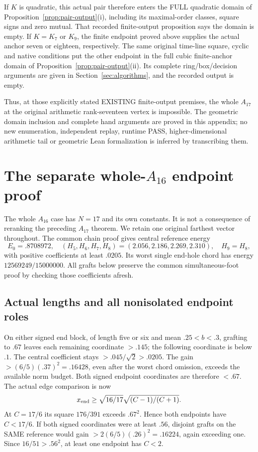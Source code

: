 If \(K\) is quadratic, this actual pair therefore enters the FULL
quadratic domain of Proposition~\ref{prop:pair-output}(i),
including its maximal-order classes, square signs and zero mutual.
That recorded finite-output proposition says the domain is empty.
If \(K=K_7\) or \(K_9\), the finite endpoint proved above supplies
the actual anchor seven or eighteen, respectively.
The same original time-line square, cyclic and native conditions
put the other endpoint in the full cubic finite-anchor domain
of Proposition~\ref{prop:pair-output}(ii).
Its complete ring/box/decision arguments are given in
Section~\ref{sec:algorithms}, and the recorded output is empty.

Thus, at those explicitly stated EXISTING finite-output premises,
the whole \(A_{17}\) at the original arithmetic rank-seventeen
vertex is impossible.
The geometric domain inclusion and complete hand arguments are
proved in this appendix; no new enumeration, independent replay,
runtime PASS, higher-dimensional arithmetic tail or geometric
Lean formalization is inferred by transcribing them.

\section{The separate whole-\(A_{16}\) endpoint proof}
\label{app:wholearithA16}

The whole \(A_{16}\) case has \(N=17\) and its own constants.
It is not a consequence of reranking the preceding \(A_{17}\)
theorem.  We retain one original farthest vector throughout.
The common chain proof gives central reference energy
\[
 E_0=.8708972,\quad
 (H_5,H_6,H_7,H_8)=(2.056,2.186,2.269,2.310),\quad H_9=H_8,
\]
with positive coefficients at least \(.0205\).
Its worst single end-hole chord has energy
\(12569249/15000000\).
All grafts below preserve the common simultaneous-foot proof
by checking those coefficients afresh.

\subsection{Actual lengths and all nonisolated endpoint roles}
\label{app:arithA16endpointlist}

On either signed end block, of length five or six and mean
\(.25<b<.3\), grafting to \(.67\) leaves each remaining
coordinate \(>.145\); the following coordinate is below \(.1\).
The central coefficient stays \(>.045/\sqrt2>.0205\).
The gain \(>(6/5)(.37)^2=.16428\), even after the worst
chord omission, exceeds the available norm budget.
Both signed endpoint coordinates are therefore \(<.67\).
The actual edge comparison is now
\[
 x_{\rm end}\ge\sqrt{16/17}\sqrt{(C-1)/(C+1)}.
\]
At \(C=17/6\) its square \(176/391\) exceeds \(.67^2\).
Hence both endpoints have \(C<17/6\).
If both signed coordinates were at least \(.56\), disjoint
grafts on the SAME reference would gain
\(>2(6/5)(.26)^2=.16224\), again exceeding one.
Since \(16/51>.56^2\), at least one endpoint has \(C<2\).

